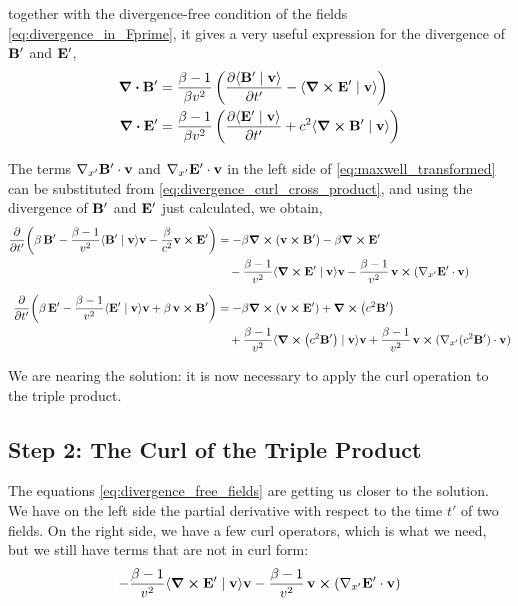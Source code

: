 \documentclass[12pt]{article}
\newcommand{\ip}[2]{\langle #1 \mid #2 \rangle}
\begin{document}
together with the divergence-free condition of the fields \eqref{eq:divergence_in_Fprime}, it
gives a very useful expression for the divergence of $\vb{B}'$ and $\vb{E}'$,
\begin{align}
  \div \vb{B}' &= \frac{\beta-1}{\beta v^2}
    \left(\pdv{\ip{\vb{B}'}{\vb{v}}}{t'} - \ip{\curl \vb{E}'}{\vb{v}}\right) \\
  \div \vb{E}' &= \frac{\beta-1}{\beta v^2}
    \left(\pdv{\ip{\vb{E}'}{\vb{v}}}{t'} + c^2\ip{\curl \vb{B}'}{\vb{v}}\right)
\end{align}

The terms $\nabla_{x'}\vb{B}' \cdot \vb{v}$ and $\nabla_{x'}\vb{E}' \cdot \vb{v}$ in the
left side of \eqref{eq:maxwell_transformed} can be substituted from
\eqref{eq:divergence_curl_cross_product}, and using the divergence of $\vb{B}'$ and $\vb{E}'$
just calculated, we obtain,
\begin{align}
  \pdv{}{t'}\!\left(\beta\,\vb{B}' - \frac{\beta-1}{v^2}\ip{\vb{B}'}{\vb{v}}\vb{v}
      - \frac{\beta}{c^2}\vb{v} \cross \vb{E}'\right)
    &= -\beta\curl(\vb{v} \cross \vb{B}') - \beta\curl \vb{E}' \nonumber \\
    &\quad - \frac{\beta-1}{v^2}\ip{\curl \vb{E}'}{\vb{v}}\vb{v}
      - \frac{\beta-1}{v^2}\,\vb{v} \cross (\nabla_{x'}\vb{E}' \cdot \vb{v}) \label{eq:divergence_free_fields} \\[6pt]
  \pdv{}{t'}\!\left(\beta\,\vb{E}' - \frac{\beta-1}{v^2}\ip{\vb{E}'}{\vb{v}}\vb{v}
      + \beta\,\vb{v} \cross \vb{B}'\right)
    &= -\beta\curl(\vb{v} \cross \vb{E}') + \curl(c^2\vb{B}') \nonumber \\
    &\quad + \frac{\beta-1}{v^2}\ip{\curl(c^2\vb{B}')}{\vb{v}}\vb{v}
      + \frac{\beta-1}{v^2}\,\vb{v} \cross (\nabla_{x'}(c^2\vb{B}') \cdot \vb{v}) \nonumber
\end{align}

We are nearing the solution: it is now necessary to apply the curl operation to the triple
product.

\subsection{Step 2: The Curl of the Triple Product}

The equations \eqref{eq:divergence_free_fields} are getting us closer to the solution. We
have on the left side the partial derivative with respect to the time $t'$ of two fields. On
the right side, we have a few curl operators, which is what we need, but we still have terms
that are not in curl form:
\begin{equation}
  -\frac{\beta-1}{v^2}\ip{\curl \vb{E}'}{\vb{v}}\vb{v}
  - \frac{\beta-1}{v^2}\,\vb{v} \cross (\nabla_{x'}\vb{E}' \cdot \vb{v})
\end{equation}
\end{document}
